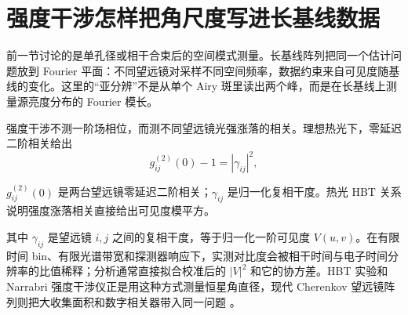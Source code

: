 \section{强度干涉怎样把角尺度写进长基线数据}

前一节讨论的是单孔径或相干合束后的空间模式测量。长基线阵列把同一个估计问题放到 Fourier 平面：不同望远镜对采样不同空间频率，数据约束来自可见度随基线的变化。这里的“亚分辨”不是从单个 Airy 斑里读出两个峰，而是在长基线上测量源亮度分布的 Fourier 模长。

强度干涉不测一阶场相位，而测不同望远镜光强涨落的相关。理想热光下，零延迟二阶相关给出
\begin{equation}
  g_{ij}^{(2)}(0)-1 = |\gamma_{ij}|^2,
  \label{eq:ch08-hbt-g2}
\end{equation}
\begin{formulaexplain}
\(g_{ij}^{(2)}(0)\) 是两台望远镜零延迟二阶相关；\(\gamma_{ij}\) 是归一化复相干度。热光 HBT 关系说明强度涨落相关直接给出可见度模平方。
\end{formulaexplain}
其中 \(\gamma_{ij}\) 是望远镜 \(i,j\) 之间的复相干度，等于归一化一阶可见度 \(V(u,v)\)。在有限时间 bin、有限光谱带宽和探测器响应下，实测对比度会被相干时间与电子时间分辨率的比值稀释；分析通常直接拟合校准后的 \(|V|^2\) 和它的协方差。HBT 实验和 Narrabri 强度干涉仪正是用这种方式测量恒星角直径，现代 Cherenkov 望远镜阵列则把大收集面积和数字相关器带入同一问题 \citep{1956Natur.177...27B,1956Natur.178.1046H,1957RSPSA.242..300B,1974iiia.book.....H,1974MNRAS.167..121H,1974MNRAS.167..475H,2008AIPC..984..205L,2013APh....43..331D,2015NatCo...6.6852D,2020NatAs...4.1164A,2024MNRAS.529.4387A}。

